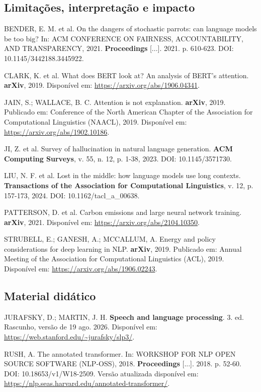 \documentclass[11pt,a4paper]{article}
\begin{document}
\subsection{Limitações, interpretação e impacto}
BENDER, E. M. et al. On the dangers of stochastic parrots: can language models be too big? In: ACM CONFERENCE ON FAIRNESS, ACCOUNTABILITY, AND TRANSPARENCY, 2021. \textbf{Proceedings} [...]. 2021. p. 610-623. DOI: 10.1145/3442188.3445922.\par
CLARK, K. et al. What does BERT look at? An analysis of BERT's attention. \textbf{arXiv}, 2019. Disponível em: \url{https://arxiv.org/abs/1906.04341}.\par
JAIN, S.; WALLACE, B. C. Attention is not explanation. \textbf{arXiv}, 2019. Publicado em: Conference of the North American Chapter of the Association for Computational Linguistics (NAACL), 2019. Disponível em: \url{https://arxiv.org/abs/1902.10186}.\par
JI, Z. et al. Survey of hallucination in natural language generation. \textbf{ACM Computing Surveys}, v. 55, n. 12, p. 1-38, 2023. DOI: 10.1145/3571730.\par
LIU, N. F. et al. Lost in the middle: how language models use long contexts. \textbf{Transactions of the Association for Computational Linguistics}, v. 12, p. 157-173, 2024. DOI: 10.1162/tacl\_a\_00638.\par
PATTERSON, D. et al. Carbon emissions and large neural network training. \textbf{arXiv}, 2021. Disponível em: \url{https://arxiv.org/abs/2104.10350}.\par
STRUBELL, E.; GANESH, A.; MCCALLUM, A. Energy and policy considerations for deep learning in NLP. \textbf{arXiv}, 2019. Publicado em: Annual Meeting of the Association for Computational Linguistics (ACL), 2019. Disponível em: \url{https://arxiv.org/abs/1906.02243}.\par
\subsection{Material didático}
JURAFSKY, D.; MARTIN, J. H. \textbf{Speech and language processing}. 3. ed. Rascunho, versão de 19 ago. 2026. Disponível em: \url{https://web.stanford.edu/~jurafsky/slp3/}.\par
RUSH, A. The annotated transformer. In: WORKSHOP FOR NLP OPEN SOURCE SOFTWARE (NLP-OSS), 2018. \textbf{Proceedings} [...]. 2018. p. 52-60. DOI: 10.18653/v1/W18-2509. Versão atualizada disponível em: \url{https://nlp.seas.harvard.edu/annotated-transformer/}.\par
\end{document}
